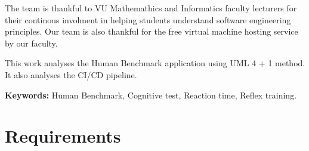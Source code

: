 \documentclass[]{VUMIFTemplateClass}
\newcommand{\EE}{\mathbb{E}\,} %
\begin{document}

\onehalfspacing


The team is thankful to VU Mathemathics and Informatics faculty lecturers for their continous involment in helping students understand software engineering principles. Our team is also thankful for the free virtual machine hosting service by our faculty. 









\singlespacing
{}
\listoffigures 

\listoftables

\tableofcontents
\onehalfspacing






This work analyses the Human Benchmark application using UML 4 + 1 method. It also analyses the CI/CD pipeline.

\textbf{Keywords:} Human Benchmark, Cognitive test, Reaction time, Reflex training.

\section{Requirements}
\end{document}
